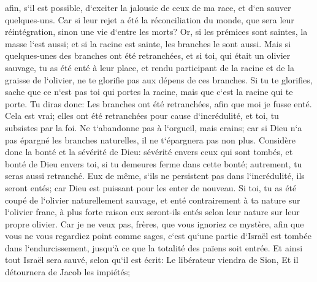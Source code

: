 \verse afin, s`il est possible, d`exciter la jalousie de ceux de ma race, et d`en sauver quelques-uns. 
\verse Car si leur rejet a été la réconciliation du monde, que sera leur réintégration, sinon une vie d`entre les morts? 
\verse Or, si les prémices sont saintes, la masse l`est aussi; et si la racine est sainte, les branches le sont aussi. 
\verse Mais si quelques-unes des branches ont été retranchées, et si toi, qui était un olivier sauvage, tu as été enté à leur place, et rendu participant de la racine et de la graisse de l`olivier, 
\verse ne te glorifie pas aux dépens de ces branches. Si tu te glorifies, sache que ce n`est pas toi qui portes la racine, mais que c`est la racine qui te porte. 
\verse Tu diras donc: Les branches ont été retranchées, afin que moi je fusse enté. 
\verse Cela est vrai; elles ont été retranchées pour cause d`incrédulité, et toi, tu subsistes par la foi. Ne t`abandonne pas à l`orgueil, mais crains; 
\verse car si Dieu n`a pas épargné les branches naturelles, il ne t`épargnera pas non plus. 
\verse Considère donc la bonté et la sévérité de Dieu: sévérité envers ceux qui sont tombés, et bonté de Dieu envers toi, si tu demeures ferme dans cette bonté; autrement, tu seras aussi retranché. 
\verse Eux de même, s`ils ne persistent pas dans l`incrédulité, ils seront entés; car Dieu est puissant pour les enter de nouveau. 
\verse Si toi, tu as été coupé de l`olivier naturellement sauvage, et enté contrairement à ta nature sur l`olivier franc, à plus forte raison eux seront-ils entés selon leur nature sur leur propre olivier. 
\verse Car je ne veux pas, frères, que vous ignoriez ce mystère, afin que vous ne vous regardiez point comme sages, c`est qu`une partie d`Israël est tombée dans l`endurcissement, jusqu`à ce que la totalité des païens soit entrée. 
\verse Et ainsi tout Israël sera sauvé, selon qu`il est écrit: Le libérateur viendra de Sion, Et il détournera de Jacob les impiétés; 
